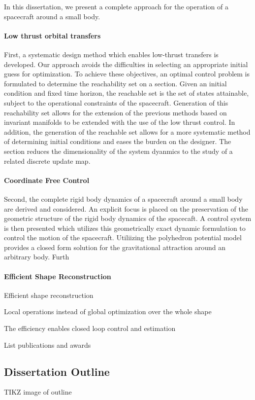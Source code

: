 In this dissertation, we present a complete approach for the operation of a spacecraft around a small body. 

\paragraph{Low thrust orbital transfers}
First, a systematic design method which enables low-thrust transfers is developed.
Our approach avoids the difficulties in selecting an appropriate initial guess for optimization.
To achieve these objectives, an optimal control problem is formulated to determine the reachability set on a \Poincare section.
Given an initial condition and fixed time horizon, the reachable set is the set of states attainable, subject to the operational constraints of the spacecraft. 
Generation of this reachability set allows for the extension of the previous methods based on invariant manifolds to be extended with the use of the low thrust control.
In addition, the generation of the reachable set allows for a more systematic method of determining initial conditions and eases the burden on the designer. 
The \Poincare section reduces the dimensionality of the system dyanmics to the study of a related discrete update map.  

\paragraph{Coordinate Free Control}
Second, the complete rigid body dynamics of a spacecraft around a small body are derived and considered.
An explicit focus is placed on the preservation of the geometric structure of the rigid body dynamics of the spacecaft.
A control system is then presented which utilizes this geometrically exact dynamic formulation to control the motion of the spacecraft. 
Utiliizing the polyhedron potential model provides a closed form solution for the gravitational attraction around an arbitrary body. 
Furth

\paragraph{Efficient Shape Reconstruction}

Efficient shape reconstruction

Local operations instead of global optimization over the whole shape

The efficiency enables closed loop control and estimation

List publications and awards

\subsection{Dissertation Outline}

TIKZ image of outline





